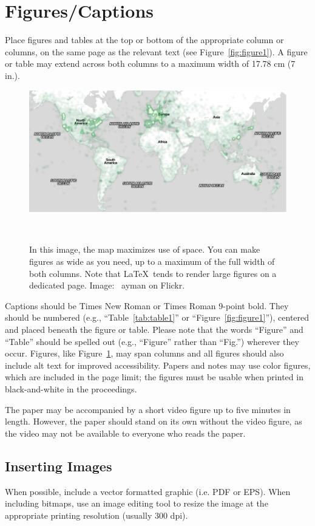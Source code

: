 \documentclass{sigchi}
\begin{document}
\section{Figures/Captions}

Place figures and tables at the top or bottom of the appropriate
column or columns, on the same page as the relevant text (see
Figure~\ref{fig:figure1}). A figure or table may extend across both
columns to a maximum width of 17.78 cm (7 in.).

\begin{figure}
  \centering
  \includegraphics[width=2\columnwidth]{figures/map}
  \caption{In this image, the map maximizes use of space. You can make
    figures as wide as you need, up to a maximum of the full width of
    both columns. Note that \LaTeX\ tends to render large figures on a
    dedicated page. Image: \ccbynd~ayman on
    Flickr.}~\label{fig:figure2}
\end{figure}

Captions should be Times New Roman or Times Roman 9-point bold.  They
should be numbered (e.g., ``Table~\ref{tab:table1}'' or
``Figure~\ref{fig:figure1}''), centered and placed beneath the figure
or table.  Please note that the words ``Figure'' and ``Table'' should
be spelled out (e.g., ``Figure'' rather than ``Fig.'') wherever they
occur. Figures, like Figure~\ref{fig:figure2}, may span columns and
all figures should also include alt text for improved accessibility.
Papers and notes may use color figures, which are included in the page
limit; the figures must be usable when printed in black-and-white in
the proceedings.

The paper may be accompanied by a short video figure up to five
minutes in length. However, the paper should stand on its own without
the video figure, as the video may not be available to everyone who
reads the paper.  

\subsection{Inserting Images}
When possible, include a vector formatted graphic (i.e. PDF or EPS).
When including bitmaps,  use an image editing tool to resize the image
at the appropriate printing resolution (usually 300 dpi).
\end{document}
